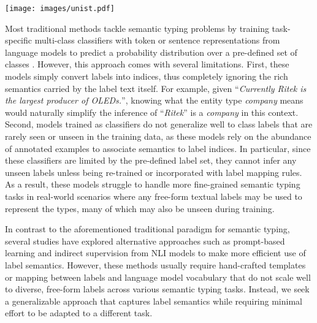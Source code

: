 \documentclass[11pt]{article}
\newcommand{\model}{\textsc{UniST}\xspace}
\begin{document}
\begin{figure*}[ht]
    \centering
    \texttt{[image: images/unist.pdf]}
\caption{\model projects the input sentence with task descriptions (in blue) and marked token span of interest (with enclosing special tokens), and candidate labels into a shared semantic embedding space. In training, it optimizes a margin ranking loss such that positive labels are closer to the input sentence than negative labels. During inference, \model simply ranks candidate labels based on the similarity between input and label embeddings.}\label{fig:overview}
\end{figure*}


Most traditional methods tackle semantic typing problems by training task-specific multi-class classifiers with token or sentence representations from language models to predict a probability distribution over a pre-defined set of classes \cite{dai-etal-2021-ultra, yamada-etal-2020-luke}. However, this approach comes with several limitations. First, these models simply convert labels into indices, thus completely ignoring the rich semantics carried by the label text itself. For example, given ``\textit{Currently Ritek is the largest producer of OLEDs.}'', knowing what the entity type \textit{company} means would naturally simplify the inference of ``\textit{Ritek}'' is a \textit{company} in this context. Second, models trained as classifiers do not generalize well to class labels that are rarely seen or unseen in the training data, as these models rely on the abundance of annotated examples to associate semantics to label indices. In particular, since these classifiers are limited by the pre-defined label set, they cannot infer any unseen labels unless being re-trained or incorporated with label mapping rules. As a result, these models struggle to handle more fine-grained semantic typing tasks in real-world scenarios \cite{choi-etal-2018-ultra, chen-etal-2020-trying} where any free-form textual labels may be used to represent the types, many of which may also be unseen during training.

In contrast to the aforementioned traditional paradigm for semantic typing, several studies have explored alternative approaches such as prompt-based learning  \cite{schick-schutze-2021-exploiting,ding2021prompt} and indirect supervision from NLI models \cite{yin-etal-2019-benchmarking,sainz-etal-2021-label} to make more efficient use of label semantics. However, these methods usually require hand-crafted templates or mapping between labels and language model vocabulary that do not scale well to diverse, free-form labels across various semantic typing tasks. Instead, we seek a generalizable approach that captures label semantics while requiring minimal effort to be adapted to a different task.
\end{document}
